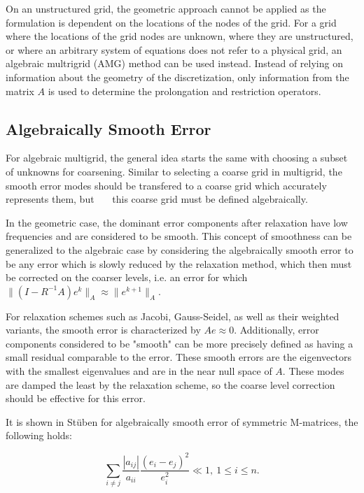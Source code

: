 On an unstructured grid, the geometric approach cannot be applied as the formulation is dependent on the locations of the nodes of the grid. For a grid where the locations of the grid nodes are unknown, where they are unstructured, or where an arbitrary system of equations does not refer to a physical grid, an algebraic multrigrid (AMG) method can be used instead. Instead of relying on information about the geometry of the discretization, only information from the matrix $A$ is used to determine the prolongation and restriction operators.


\subsection{Algebraically Smooth Error}

For algebraic multigrid, the general idea starts the same with choosing a subset of unknowns for coarsening. Similar to selecting a coarse grid in multigrid, the smooth error modes should be transfered to a coarse grid which accurately represents them, but ~~~this coarse grid must be defined algebraically.~~~ %

In the geometric case, the dominant error components after relaxation have low frequencies and are considered to be smooth. This concept of smoothness can be generalized to the algebraic case by considering the algebraically smooth error to be any error which is slowly reduced by the relaxation method, which then must be corrected on the coarser levels, i.e. an error for which $ \|(I - R^{-1}A)e^{k}\|_A \approx \| e^{k+1}\|_A $.

For relaxation schemes such as Jacobi, Gauss-Seidel, as well as their weighted variants, the smooth error is characterized by $ Ae \approx 0 $. Additionally, error components considered to be "smooth" can be more precisely defined as having a small residual comparable to the error. These smooth errors are the eigenvectors with the smallest eigenvalues and are in the near null space of $A$. These modes are damped the least by the relaxation scheme, so the coarse level correction should be effective for this error.

It is shown in Stüben for algebraically smooth error of symmetric M-matrices, the following holds:

\begin{equation}
	\sum_{i \neq j}{\frac{|a_{ij}|}{a_{ii}}\frac{(e_i - e_j)^2}{e_i^2}} \ll 1,\ 1 \leq i \leq n.
	\label{eq:strong_connection}
\end{equation}

